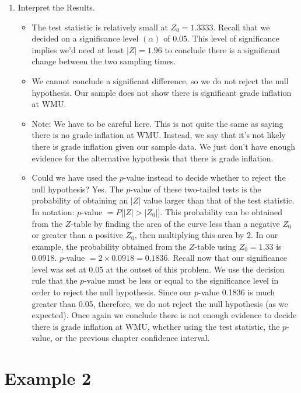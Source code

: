 \documentclass[11pt]{book}\usepackage[]{graphicx}\usepackage[]{color}
\begin{document}
\begin{enumerate}
\item Interpret the Results.

\begin{itemize}
\item The test statistic is relatively small at $Z_0 = 1.3333$.  Recall that we decided on a significance level $(\alpha)$ of 0.05. This level of significance implies we’d need at least $|Z| = 1.96$ to conclude there is a significant change between the two sampling times.

\item We cannot conclude a significant difference, so we do not reject the null hypothesis. Our sample does not show there is significant grade inflation at WMU.

\item Note: We have to be careful here. This is not quite the same as saying there is no grade inflation at WMU. Instead, we say that it’s not likely there is grade inflation given our sample data. We just don’t have enough evidence for the alternative hypothesis that there is grade inflation.

\item Could we have used the $p$-value instead to decide whether to reject the null hypothesis? Yes. The $p$-value of these two-tailed tests is the probability of obtaining an $|Z|$ value larger than that of the test statistic.  In notation: 
$p$-value $ = P[ |Z| > |Z_0|$].  This probability can be obtained from the $Z$-table by finding the area of the curve less than a negative $Z_0$ or greater than a positive $Z_0$, then multiplying this area by 2. In our example, the probability obtained from the $Z$-table using $Z_0 = 1.33$ is 0.0918.  $p$-value $= 2 \times 0.0918 = 0.1836$. Recall now that our significance level was set at 0.05 at the outset of this problem.  We use the decision rule that the $p$-value must be less or equal to the significance level in order to reject the null hypothesis. 
Since our $p$-value 0.1836 is much greater than 0.05, therefore, we do not reject the null hypothesis (as we expected). Once again we conclude there is not enough evidence to decide there is grade inflation at WMU, whether using the test statistic, the $p$-value, or the previous chapter confidence interval.

\end{itemize}

\end{enumerate}

\section{Example 2}
\end{document}
